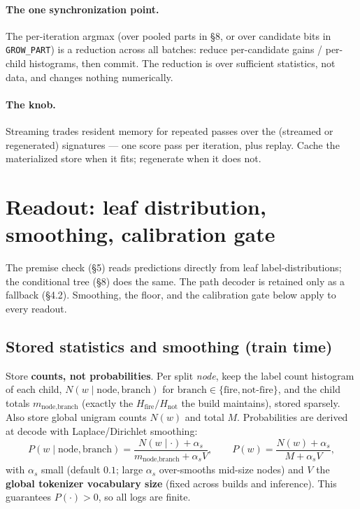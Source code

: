 \documentclass[11pt]{article}
\newcommand{\code}[1]{\texttt{#1}}
\newcommand{\grow}{\code{GROW\_PART}}
\begin{document}
\paragraph{The one synchronization point.} The per-iteration argmax (over pooled parts in \S8, or over candidate bits in \grow) is a reduction across all batches: reduce per-candidate gains / per-child histograms, then commit. The reduction is over sufficient statistics, not data, and changes nothing numerically.

\paragraph{The knob.} Streaming trades resident memory for repeated passes over the (streamed or regenerated) signatures --- one score pass per iteration, plus replay. Cache the materialized store when it fits; regenerate when it does not.


\section{Readout: leaf distribution, smoothing, calibration gate}

The premise check (\S5) reads predictions directly from leaf label-distributions; the conditional tree (\S8) does the same. The path decoder is retained only as a fallback (\S4.2). Smoothing, the floor, and the calibration gate below apply to every readout.

\subsection{Stored statistics and smoothing (train time)}
Store \textbf{counts, not probabilities}. Per split \emph{node}, keep the label count histogram of each child, $N(w\mid \text{node},\text{branch})$ for $\text{branch}\in\{\text{fire},\text{not-fire}\}$, and the child totals $m_{\text{node},\text{branch}}$ (exactly the $H_{\text{fire}}/H_{\text{not}}$ the build maintains), stored sparsely. Also store global unigram counts $N(w)$ and total $M$. Probabilities are derived at decode with Laplace/Dirichlet smoothing:
\[
P(w\mid \text{node},\text{branch})=\frac{N(w\mid\cdot)+\alpha_s}{m_{\text{node},\text{branch}}+\alpha_s V},\qquad
P(w)=\frac{N(w)+\alpha_s}{M+\alpha_s V},
\]
with $\alpha_s$ small (default $0.1$; large $\alpha_s$ over-smooths mid-size nodes) and $V$ the \textbf{global tokenizer vocabulary size} (fixed across builds and inference). This guarantees $P(\cdot)>0$, so all logs are finite.
\end{document}
